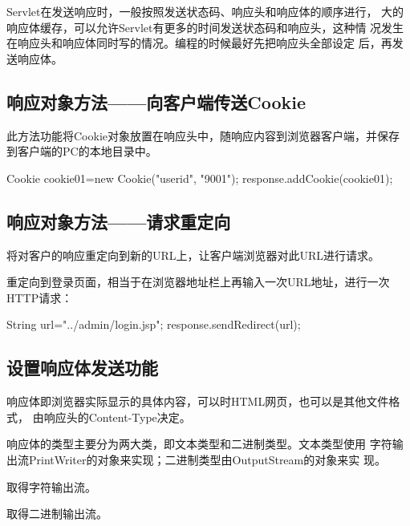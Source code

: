 {\kai Servlet在发送响应时，一般按照发送状态码、响应头和响应体的顺序进行，
  大的响应体缓存，可以允许Servlet有更多的时间发送状态码和响应头，这种情
  况发生在响应头和响应体同时写的情况。}编程的时候最好先把响应头全部设定
后，再发送响应体。

\subsection{响应对象方法——向客户端传送Cookie} 


此方法功能将Cookie对象放置在响应头中，随响应内容到浏览器客户端，并保存
到客户端的PC的本地目录中。

\begin{javaCode}
  Cookie cookie01=new Cookie("userid", "9001");
  response.addCookie(cookie01);
\end{javaCode}

\subsection{响应对象方法——请求重定向} 


将对客户的响应重定向到新的URL上，让客户端浏览器对此URL进行请求。

{\kai 重定向到登录页面，相当于在浏览器地址栏上再输入一次URL地址，进行一次HTTP请求：}

\begin{javaCode}
  String url="../admin/login.jsp";
  response.sendRedirect(url);
\end{javaCode}

\subsection{设置响应体发送功能}

响应体即浏览器实际显示的具体内容，可以时HTML网页，也可以是其他文件格式，
由响应头的Content-Type决定。

响应体的类型主要分为两大类，即文本类型和二进制类型。{\Red 文本类型使用
  字符输出流PrintWriter的对象来实现；二进制类型由OutputStream的对象来实
  现。}


取得字符输出流。


取得二进制输出流。

